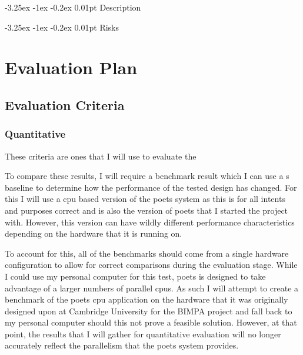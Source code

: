 \documentclass[paper=a4, fontsize=11pt, bibliography=totocnumbered]{scrartcl}
\makeatletter
\renewcommand\paragraph{\@startsection{paragraph}{4}{\z@}%
  {-3.25ex \@plus -1ex \@minus -0.2ex}%
  {0.01pt}%
  {\raggedsection\normalfont\sectfont\nobreak\size@paragraph}%
}
\numberwithin{equation}{section}		%
\numberwithin{figure}{section}			%
\numberwithin{table}{section}				%
\makeatother
\begin{document}
\paragraph{Description}

\paragraph{Risks}

\section{Evaluation Plan}

\subsection{Evaluation Criteria}

\subsubsection{Quantitative}\label{subsec:quantitative}

These criteria are ones that I will use to evaluate the 

To compare these results, I will require a benchmark result which I can use a s baseline to determine how the performance of the tested design has changed. For this I will use a \gls{cpu} based version of the \gls{poets} system as this is for all intents and purposes correct and is also the version of \gls{poets} that I started the project with. However, this version can have wildly different performance characteristics depending on the hardware that it is running on.

To account for this, all of the benchmarks should come from a single hardware configuration to allow for correct comparisons during the evaluation stage. While I could use my personal computer for this test, \gls{poets} is designed to take advantage of a larger numbers of parallel \glspl{cpu}. As such I will attempt to create a benchmark of the \gls{poets} \gls{cpu} application on the hardware that it was originally designed upon at Cambridge University for the BIMPA project\cite{pub:naylor2014rapid} and fall back to my personal computer should this not prove a feasible solution. However, at that point, the results that I will gather for quantitative evaluation will no longer accurately reflect the parallelism that the \gls{poets} system provides.
\end{document}
